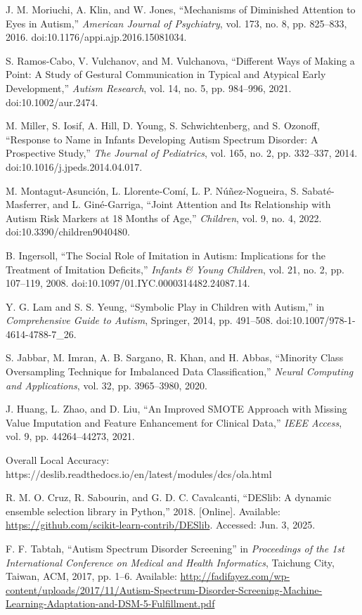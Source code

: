 \documentclass[conference]{IEEEtran}
\begin{document}
\begin{thebibliography}{99}
 J. M. Moriuchi, A. Klin, and W. Jones, ``Mechanisms of Diminished Attention to Eyes in Autism,'' \textit{American Journal of Psychiatry}, vol. 173, no. 8, pp. 825--833, 2016. doi:10.1176/appi.ajp.2016.15081034.

 S. Ramos-Cabo, V. Vulchanov, and M. Vulchanova, ``Different Ways of Making a Point: A Study of Gestural Communication in Typical and Atypical Early Development,'' \textit{Autism Research}, vol. 14, no. 5, pp. 984--996, 2021. doi:10.1002/aur.2474.

 M. Miller, S. Iosif, A. Hill, D. Young, S. Schwichtenberg, and S. Ozonoff, ``Response to Name in Infants Developing Autism Spectrum Disorder: A Prospective Study,'' \textit{The Journal of Pediatrics}, vol. 165, no. 2, pp. 332--337, 2014. doi:10.1016/j.jpeds.2014.04.017.

 M. Montagut-Asunción, L. Llorente-Comí, L. P. Núñez-Nogueira, S. Sabaté-Masferrer, and L. Giné-Garriga, ``Joint Attention and Its Relationship with Autism Risk Markers at 18 Months of Age,'' \textit{Children}, vol. 9, no. 4, 2022. doi:10.3390/children9040480.

 B. Ingersoll, ``The Social Role of Imitation in Autism: Implications for the Treatment of Imitation Deficits,'' \textit{Infants \& Young Children}, vol. 21, no. 2, pp. 107--119, 2008. doi:10.1097/01.IYC.0000314482.24087.14.

 Y. G. Lam and S. S. Yeung, ``Symbolic Play in Children with Autism,'' in \textit{Comprehensive Guide to Autism}, Springer, 2014, pp. 491--508. doi:10.1007/978-1-4614-4788-7\_26.

 S. Jabbar, M. Imran, A. B. Sargano, R. Khan, and H. Abbas, ``Minority Class Oversampling Technique for Imbalanced Data Classification,'' \textit{Neural Computing and Applications}, vol. 32, pp. 3965--3980, 2020.

 J. Huang, L. Zhao, and D. Liu, ``An Improved SMOTE Approach with Missing Value Imputation and Feature Enhancement for Clinical Data,'' \textit{IEEE Access}, vol. 9, pp. 44264--44273, 2021.

 Overall Local Accuracy: https://deslib.readthedocs.io/en/latest/modules/dcs/ola.html

 R. M. O. Cruz, R. Sabourin, and G. D. C. Cavalcanti, ``DESlib: A dynamic ensemble selection library in Python,'' 2018. [Online]. Available: \url{https://github.com/scikit-learn-contrib/DESlib}. Accessed: Jun. 3, 2025.

 F. F. Tabtah, “Autism Spectrum Disorder Screening” in \textit{Proceedings of the 1st International Conference on Medical and Health Informatics}, Taichung City, Taiwan, ACM, 2017, pp. 1–6. Available: \url{http://fadifayez.com/wp-content/uploads/2017/11/Autism-Spectrum-Disorder-Screening-Machine-Learning-Adaptation-and-DSM-5-Fulfillment.pdf}

\end{thebibliography}
\end{document}

